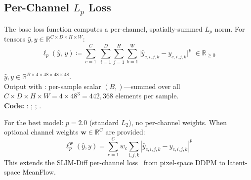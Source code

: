 \subsection{Per-Channel \texorpdfstring{$L_p$}{Lp} Loss}
\label{sec:lp_loss}

The base loss function computes a per-channel, spatially-summed $L_p$ norm.
For tensors $\hat{y}, y \in \mathbb{R}^{C \times D \times H \times W}$:
\begin{equation}
  \ell_p(\hat{y},\,y)
    \coloneqq \sum_{c=1}^{C}\;\sum_{i=1}^{D}\sum_{j=1}^{H}\sum_{k=1}^{W}
      \bigl|\hat{y}_{c,i,j,k} - y_{c,i,j,k}\bigr|^p
    \;\in \mathbb{R}_{\ge 0}
  \label{eq:lp_loss}
\end{equation}
\begin{shapes}
$\hat{y}, y \in \mathbb{R}^{B \times 4 \times 48 \times 48 \times 48}$.\\
Output with : per-sample scalar $(B,)$---summed over all
$C \times D \times H \times W = 4 \times 48^3 = 442{,}368$ elements per sample.\\
\textbf{Code:} :
; ;
.
\end{shapes}

\noindent
For the best model: $p{=}2.0$ (standard $L_2$), no per-channel weights.
When optional channel weights $\mathbf{w} \in \mathbb{R}^C$ are provided:
\begin{equation}
  \ell_p^{\mathbf{w}}(\hat{y},y)
    = \sum_{c=1}^{C} w_c \!\sum_{i,j,k}
      |\hat{y}_{c,i,j,k} - y_{c,i,j,k}|^p
  \label{eq:lp_weighted}
\end{equation}
This extends the SLIM-Diff per-channel loss~\cite{slimdiff} from pixel-space
DDPM to latent-space MeanFlow.
